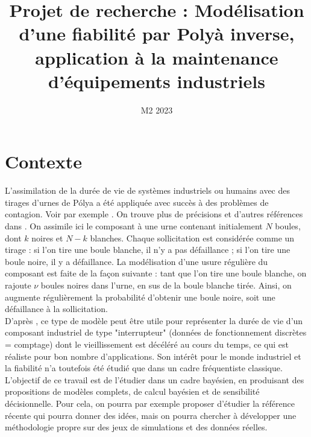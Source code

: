 \documentclass[10pt]{article}
\title{Projet de recherche : Mod\'elisation d'une fiabilit\'e par Poly\`a inverse, application \`a la maintenance d'\'equipements industriels }
\date{M2 2023}
\newcommand{\1}{\mathbbm{1}}
\begin{document}
\maketitle

 





\section{Contexte}

L'assimilation de la dur\'ee de vie de syst\`emes industriels ou humains avec des tirages d'urnes de P\'olya a \'et\'e appliqu\'ee avec succ\`es \`a  des probl\`emes de contagion. Voir par exemple \cite{Alajaji1993,Marshall1993,Hayhoe2017}. On trouve plus de pr\'ecisions et d'autres r\'ef\'erences dans \cite{Xie2002}. 
On assimile ici le composant \`a  une urne contenant initialement $N$ boules, dont $k$ noires et $N-k$ blanches. Chaque sollicitation est consid\'er\'ee comme un tirage : si l'on tire une boule blanche, il n'y a pas d\'efaillance ; si l'on tire une boule noire, il y a d\'efaillance. La mod\'elisation d'une usure r\'eguli\`ere du composant est faite de la fa\c con suivante : tant que l'on tire une boule blanche, on rajoute $\nu$ boules noires dans l'urne, en sus de la boule blanche tir\'ee. Ainsi, on augmente r\'eguli\`erement la probabilit\'e d'obtenir une boule noire, soit une d\'efaillance \`a  la sollicitation. \\

D'apr\`es \cite{pasanisi2015}, ce type de mod\`ele peut \^etre utile pour repr\'esenter la dur\'ee de vie d'un composant industriel de type "interrupteur" (donn\'ees de fonctionnement discr\`etes = comptage) dont le vieillissement est d\'ec\'el\'er\'e au cours du temps, ce qui est r\'ealiste pour bon nombre d'applications. Son int\'er\^et pour le monde industriel et la fiabilit\'e n'a toutefois \'et\'e \'etudi\'e que dans un cadre fr\'equentiste classique. \\

L'objectif de ce travail est de l'\'etudier dans un cadre bay\'esien, en produisant des propositions de mod\`eles  complets, de calcul bay\'esien et de sensibilit\'e d\'ecision\-nelle. Pour cela, on pourra par exemple proposer d'\'etudier la r\'ef\'erence r\'ecente \cite{Glynn2019} qui pourra donner des id\'ees, mais on pourra chercher \`a d\'evelopper une m\'ethodologie propre sur des jeux de simulations et des donn\'ees r\'eelles. \\
\end{document}
